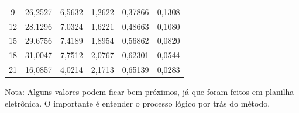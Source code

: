 \begin{table}[H]
\begin{tabular}{c|c|c|c|c|c}
9                                                 & 26,2527                                                                      & 6,5632                                                              & 1,2622                                                                & 0,37866                                                                    & 0,1308                                                             \\
12                                                & 28,1296                                                                      & 7,0324                                                              & 1,6221                                                                & 0,48663                                                                    & 0,1080                                                             \\
15                                                & 29,6756                                                                      & 7,4189                                                              & 1,8954                                                                & 0,56862                                                                    & 0,0820                                                             \\
18                                                & 31,0047                                                                      & 7,7512                                                              & 2,0767                                                                & 0,62301                                                                    & 0,0544                                                             \\
21                                                & 16,0857                                                                      & 4,0214                                                              & 2,1713                                                                & 0,65139                                                                    & 0,0283                                                             \\ \hline
\end{tabular}
\end{table}

Nota: Alguns valores podem ficar bem próximos, já que foram feitos em planilha eletrônica. O importante é entender o processo lógico por trás do método.

